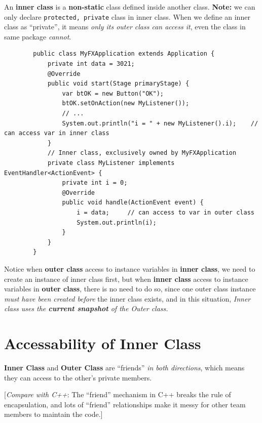 \documentclass[11pt, a4paper]{COMP3021}
\begin{document}
\begin{spacing}{1.2}
    An {\bf inner class} is a {\bf non-static} class defined inside another class.
    {\bf Note: }we can only declare \texttt{protected, private} class in 
    inner class. When we define an inner class as ``private'', it means {\it only 
    its outer class can access it}, even the class in same package {\it cannot}.
    \begin{verbatim}
        public class MyFXApplication extends Application {
            private int data = 3021;
            @Override
            public void start(Stage primaryStage) {
                var btOK = new Button("OK");
                btOK.setOnAction(new MyListener());
                // ...
                System.out.println("i = " + new MyListener().i);    // can access var in inner class
            }
            // Inner class, exclusively owned by MyFXApplication
            private class MyListener implements EventHandler<ActionEvent> {
                private int i = 0;
                @Override
                public void handle(ActionEvent event) {
                    i = data;     // can access to var in outer class
                    System.out.println(i);
                }
            }
        }
    \end{verbatim}

    Notice when {\bf outer class} access to instance variables in {\bf inner class}, we need 
    to create an instance of inner class first, but when {\bf inner class} access 
    to instance variables in {\bf outer class}, there is no need to do so, 
    since one outer class instance {\it must have been created before} the inner class 
    exists, and in this situation, {\it Inner class uses the \textbf{current snapshot} 
    of the Outer class.}


    \newpage
    \section{Accessability of Inner Class}

    {\bf Inner Class} and {\bf Outer Class} are ``friends'' {\it in both directions},
    which means they can access to the other's private members.

    [{\it Compare with C++}: The ``friend'' mechanism in C++ breaks the rule of 
    encapsulation, and lots of ``friend'' relationships make it messy for other 
    team members to maintain the code.]
    
\end{spacing}
\end{document}
